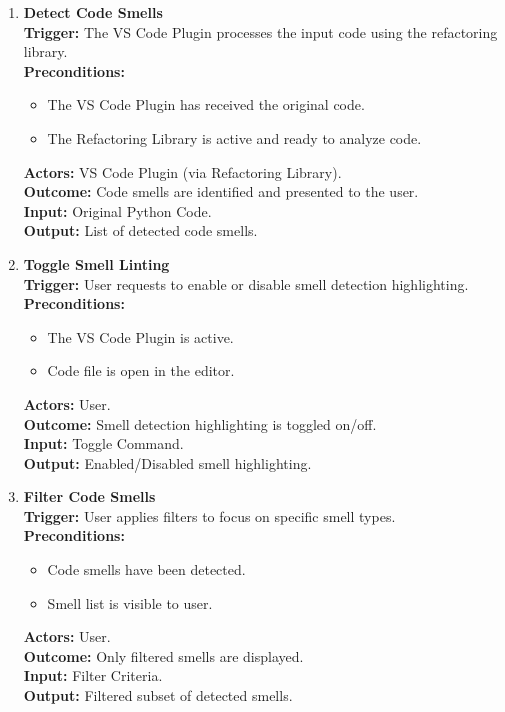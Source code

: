 \documentclass[12pt]{article}
\begin{document}
\setlength{\parindent}{0pt}
\begin{enumerate}[label={\bf PUC \arabic*:}, wide=0pt, font=\itshape]

  \item \textbf{Detect Code Smells} \\[2mm]
    \textbf{Trigger:} The VS Code Plugin processes the input code
    using the refactoring library. \\[2mm]
    \textbf{Preconditions:}
    \begin{itemize}
      \item The VS Code Plugin has received the original code.
      \item The Refactoring Library is active and ready to analyze code.
    \end{itemize}
    \textbf{Actors:} VS Code Plugin (via Refactoring Library). \\
    \textbf{Outcome:} Code smells are identified and presented to the user. \\
    \textbf{Input:} Original Python Code. \\
    \textbf{Output:} List of detected code smells.

  \item \textbf{Toggle Smell Linting} \\[2mm]
    \textbf{Trigger:} User requests to enable or disable smell
    detection highlighting. \\[2mm]
    \textbf{Preconditions:}
    \begin{itemize}
      \item The VS Code Plugin is active.
      \item Code file is open in the editor.
    \end{itemize}
    \textbf{Actors:} User. \\
    \textbf{Outcome:} Smell detection highlighting is toggled on/off. \\
    \textbf{Input:} Toggle Command. \\
    \textbf{Output:} Enabled/Disabled smell highlighting.

  \item \textbf{Filter Code Smells} \\[2mm]
    \textbf{Trigger:} User applies filters to focus on specific smell
    types. \\[2mm]
    \textbf{Preconditions:}
    \begin{itemize}
      \item Code smells have been detected.
      \item Smell list is visible to user.
    \end{itemize}
    \textbf{Actors:} User. \\
    \textbf{Outcome:} Only filtered smells are displayed. \\
    \textbf{Input:} Filter Criteria. \\
    \textbf{Output:} Filtered subset of detected smells.


\end{enumerate}
\end{document}
